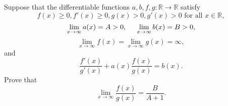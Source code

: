 \documentclass{article}
\begin{document}
\setlength{\parindent}{0pt}
Suppose that the differentiable functions $a,b,f,g:\mathbb{R}\to\mathbb{R}$ satisfy$$f(x)\ge0,f'(x)\ge0,g(x)>0,g'(x)>0\text{ for all }x\in\mathbb{R},$$$$\lim_{x\to\infty}a(x)=A>0,\hspace*{0.5cm}\lim_{x\to\infty}b(x)=B>0,$$$$\lim_{x\to\infty}f(x)=\lim_{x\to\infty}g(x)=\infty,$$and$$\frac{f'(x)}{g'(x)}+a(x)\frac{f(x)}{g(x)}=b(x).$$Prove that$$\lim_{x\to\infty}\frac{f(x)}{g(x)}=\frac{B}{A+1}.$$
\end{document}
